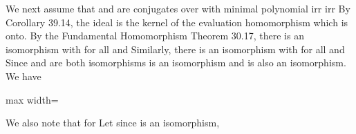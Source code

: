 \documentclass[11pt,oneside]{article}
\begin{document}
\begin{BookBody}

We next assume that \BookInline{\alpha } and \BookInline{\beta } are conjugates over  with minimal polynomial  irr irr By Corollary 39.14, the ideal  is the kernel of the evaluation homomorphism  which is onto. By the Fundamental Homomorphism Theorem 30.17, there is an isomorphism  with  for all  and  Similarly, there is an isomorphism  with  for all  and   Since \BookInline{\psi _{\alpha }} and \BookInline{\psi _{\beta }} are both isomorphisms is an isomorphism and  is also an isomorphism. We have

\begin{center}\begin{adjustbox}{max width=\linewidth}\end{adjustbox}\end{center}

We also note that for  Let  since \BookInline{\psi _{\alpha,\allowbreak \beta }} is an isomorphism,


\end{BookBody}
\end{document}
